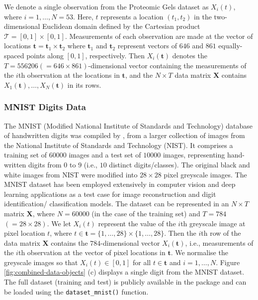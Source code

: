 We denote a single observation from the Proteomic Gels dataset as $X_i(t)$, where $i=1, \dots, N = 53$.
Here, $t$ represents a location $(t_1, t_2)$ in the two-dimensional Euclidean domain defined by the Cartesian product $\mathcal{T} = [0, 1] \times [0, 1]$.
Measurements of each observation are made at the vector of locations $\mathbf{t} = \mathbf{t}_1 \times \mathbf{t}_2$ where $\mathbf{t}_1$ and $\mathbf{t}_2$ represent vectors of $646$ and $861$ equally-spaced points along $[0, 1]$, respectively.
Then $X_i (\mathbf{t})$ denotes the $T = 556206 ( = 646 \times 861)$-dimensional vector containing the measurements of the $i$th observation at the locations in $\mathbf{t}$, and the $N \times T$ data matrix $\mathbf{X}$ contains $X_1 (\mathbf{t}), \dots, X_N (\mathbf{t})$ in its rows.


\subsubsection{MNIST Digits Data}

The MNIST (Modified National Institute of Standards and Technology) database of handwritten digits was compiled by \textcite{lecun_mnist_1998}, from a larger collection of images from the National Institute of Standards and Technology (NIST).
It comprises a training set of $60000$ images and a test set of $10000$ images, representing hand-written digits from $0$ to $9$ (i.e., $10$ distinct digits/classes).
The original black and white images from NIST were modified into $28 \times 28$ pixel greyscale images.
The MNIST dataset has been employed extensively in computer vision and deep learning applications as a test case for image reconstruction and digit identification/ classification models.
The dataset can be represented in an $N \times T$ matrix $\mathbf{X}$, where $N = 60000$ (in the case of the training set) and $T= 784$ $(= 28 \times 28)$.
We let $X_i(t)$ represent the value of the $i$th greyscale image at pixel location $t$, where $t \in \mathbf{t} = \{1, \dots, 28\} \times \{1, \dots, 28\}$.
Then the $i$th row of the data matrix $\mathbf{X}$ contains the $784$-dimensional vector $X_i(\mathbf{t})$, i.e., measurements of the $i$th observation at the vector of pixel locations in $\mathbf{t}$.
We normalise the greyscale images so that $X_i(t) \in [0, 1]$ for all $t \in \mathbf{t}$ and $i = 1, \dots, N$. 
Figure \ref{fig:combined-data-objects} (c) displays a single digit from the MNIST dataset.
The full dataset (training and test) is publicly available in the   package \parencite{kalinowski_keras_2024} and can be loaded using the \texttt{dataset\_mnist()} function.





